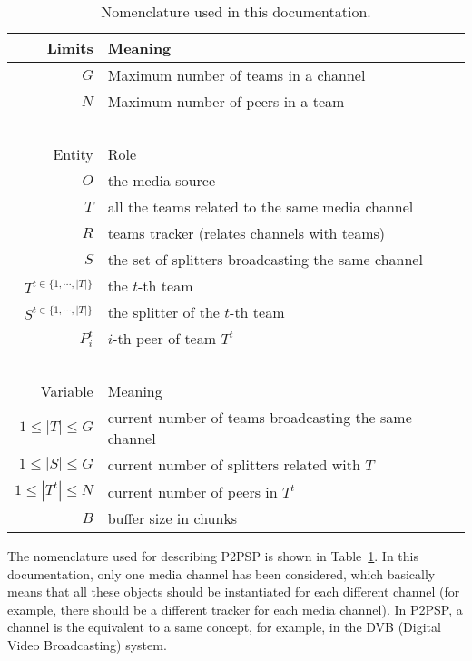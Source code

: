 \begin{table}
  \begin{tabular}{rl}
    Limits   & Meaning \\
    \hline
    $G$     & Maximum number of teams in a channel \\
    $N$     & Maximum number of peers in a team \\
    ~\\
    Entity  & Role \\
    \hline
    $O$     & the media source \\
    $T$     & all the teams related to the same media channel \\
    $R$     & teams tracker (relates channels with teams)\\
    $S$     & the set of splitters broadcasting the same channel \\
    $T^{t\in\{1,\cdots,|T|\}}$ & the $t$-th team \\
    $S^{t\in\{1,\cdots,|T|\}}$ & the splitter of the $t$-th team \\
    $P^t_i$ & $i$-th peer of team $T^t$ \\
    ~\\
    Variable & Meaning \\
    \hline
    $1\leq |T|\leq G$   & current number of teams broadcasting the same channel \\
    $1\leq |S|\leq G$ & current number of splitters related with $T$ \\
    $1\leq |T^t|\leq N$ & current number of peers in $T^t$ \\
    $B$     & buffer size in chunks \\
  \end{tabular}
  \caption{Nomenclature used in this
    documentation.\label{tab:nomenclature}}
\end{table}

The nomenclature used for describing P2PSP is shown in
Table~\ref{tab:nomenclature}. In this documentation, only one media
channel has been considered, which basically means that all these
objects should be instantiated for each different channel (for
example, there should be a different tracker for each media
channel). In P2PSP, a channel is the equivalent to a same concept, for
example, in the DVB (Digital Video Broadcasting) system.
